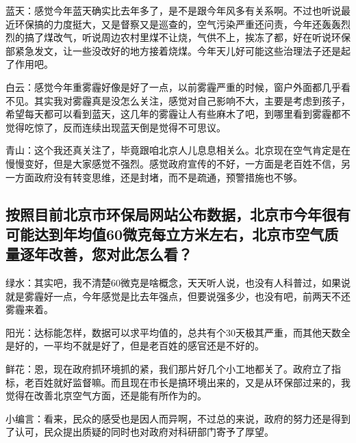 \documentclass[]{book}
\begin{document}
蓝天：感觉今年蓝天确实比去年多了，是不是跟今年风多有关系啊。不过也听说最近环保搞的力度挺大，又是督察又是巡查的，空气污染严重还问责，今年还轰轰烈烈的搞了煤改气，听说周边农村里煤不让烧，气供不上，挨冻了都，好在听说环保部紧急发文，让一些没改好的地方接着烧煤。今年天儿好可能这些治理法子还是起了作用吧。

白云：感觉今年重雾霾好像是好了一点，以前雾霾严重的时候，窗户外面都几乎看不见。其实我对雾霾真是没怎么关注，感觉对自己影响不大，主要是考虑到孩子，希望每天都可以看到蓝天，这几年的雾霾让人有些麻木了吧，到哪里看到雾霾都不觉得吃惊了，反而连续出现蓝天倒是觉得不可思议。

青山：这个我还真关注了，毕竟跟咱北京人儿息息相关么。北京现在空气肯定是在慢慢变好，但是大家感觉不强烈。感觉政府宣传的不好，一方面是老百姓不信，另一方面政府没有转变思维，还是封堵，而不是疏通，预警措施也不够。

\hypertarget{ux6309ux7167ux76eeux524dux5317ux4eacux5e02ux73afux4fddux5c40ux7f51ux7ad9ux516cux5e03ux6570ux636eux5317ux4eacux5e02ux4ecaux5e74ux5f88ux6709ux53efux80fdux8fbeux5230ux5e74ux5747ux503c60ux5faeux514bux6bcfux7acbux65b9ux7c73ux5de6ux53f3ux5317ux4eacux5e02ux7a7aux6c14ux8d28ux91cfux9010ux5e74ux6539ux5584ux60a8ux5bf9ux6b64ux600eux4e48ux770b}{%
\subsection{按照目前北京市环保局网站公布数据，北京市今年很有可能达到年均值60微克每立方米左右，北京市空气质量逐年改善，您对此怎么看？}\label{ux6309ux7167ux76eeux524dux5317ux4eacux5e02ux73afux4fddux5c40ux7f51ux7ad9ux516cux5e03ux6570ux636eux5317ux4eacux5e02ux4ecaux5e74ux5f88ux6709ux53efux80fdux8fbeux5230ux5e74ux5747ux503c60ux5faeux514bux6bcfux7acbux65b9ux7c73ux5de6ux53f3ux5317ux4eacux5e02ux7a7aux6c14ux8d28ux91cfux9010ux5e74ux6539ux5584ux60a8ux5bf9ux6b64ux600eux4e48ux770b}}

绿水：其实吧，我不清楚60微克是啥概念，天天听人说，也没有人科普过，如果说就是雾霾好一点，今年感觉是比去年强点，但要说强多少，也没有吧，前两天不还雾霾来着。

阳光：达标能怎样，数据可以求平均值的，总共有个30天极其严重，而其他天数全是好的，一平均不就是好了，但是老百姓的感官还是不好的。

鲜花：恩，现在政府抓环境抓的紧，我们那片好几个小工地都关了。政府立了指标，老百姓就好监督嘛。而且现在市长是搞环境出来的，又是从环保部过来的，我觉得在改善北京空气方面，还是能有所作为的。

小编言：看来，民众的感受也是因人而异啊，不过总的来说，政府的努力还是得到了认可，民众提出质疑的同时也对政府对科研部门寄予了厚望。
\end{document}

